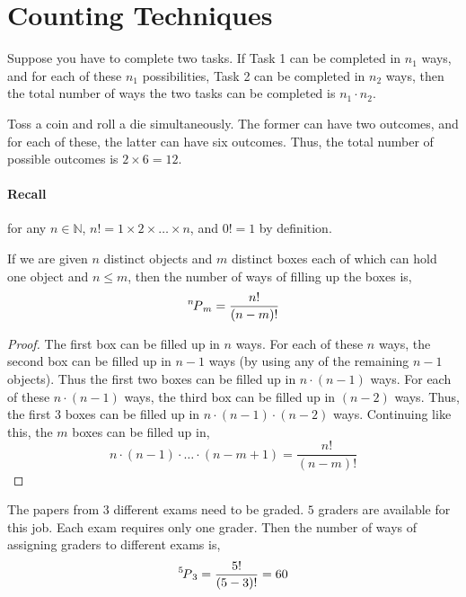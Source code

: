 \section{Counting Techniques}
Suppose you have to complete two tasks. If Task 1 can be completed in $n_1$
ways, and for each of these $n_1$ possibilities, Task 2 can be completed in
$n_2$ ways, then the total number of ways the two tasks can be completed is
$n_1 \cdot n_2$.
\begin{example}
Toss a coin and roll a die simultaneously. The former can have two outcomes,
and for each of these, the latter can have six outcomes. Thus, the total number
of possible outcomes is $2 \times 6 = 12$. 
\end{example}

\paragraph{Recall} for any $n \in \mathbb{N}$, $n! = 1 \times 2 \times
\dots \times n$, and $0! = 1$ by definition. 

\begin{theorem}
    If we are given $n$ distinct objects and $m$ distinct boxes each of which
can hold one object and $n \leq m$, then the number of ways of filling up the
boxes is, 
\begin{equation*}
    \perm[n]{m} = \frac{n!}{(n - m)!}
\end{equation*}
\end{theorem}
\begin{proof}
    The first box can be filled up in $n$ ways. For each of these $n$ ways, the
second box can be filled up in $n - 1$ ways (by using any of the remaining $n
- 1$ objects). Thus the first two boxes can be filled up in $n \cdot (n - 1)$
ways. For each of these $n \cdot (n - 1)$ ways, the third box can be filled up
in $(n - 2)$ ways. Thus, the first $3$ boxes can be filled up in $n \cdot (n -
1) \cdot (n - 2)$ ways. Continuing like this, the $m$ boxes can be filled up
in, 
\begin{equation*}
    n \cdot (n-1) \cdot \dots \cdot (n - m + 1) = \frac{n!}{(n - m)!}
\end{equation*}
\end{proof}

\begin{example}
The papers from $3$ different exams need to be graded. $5$ graders are
available for this job. Each exam requires only one grader. Then the number of
ways of assigning graders to different exams is, 
\begin{equation*}
    \perm[5]{3} = \frac{5!}{(5 - 3)!} = 60
\end{equation*}
\end{example}

